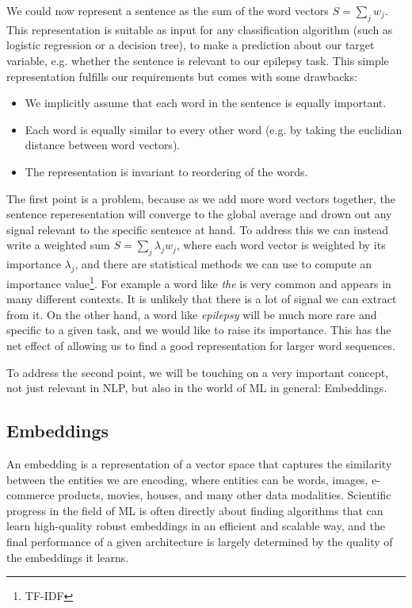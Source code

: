 We could now represent a sentence as the sum of the word vectors $S = \sum_j w_j$. This representation is suitable as input for any classification algorithm (such as logistic regression or a decision tree), to make a prediction about our target variable, e.g. whether the sentence is relevant to our epilepsy task.
This simple representation fulfills our requirements but comes with some drawbacks:
\begin{itemize}
    \item We implicitly assume that each word in the sentence is equally important.
    \item Each word is equally similar to every other word (e.g. by taking the euclidian distance between word vectors).
    \item The representation is invariant to reordering of the words.
\end{itemize}
The first point is a problem, because as we add more word vectors together, the sentence reperesentation will converge to the global average and drown out any signal relevant to the specific sentence at hand.
To address this we can instead write a weighted sum $S = \sum_j \lambda_j w_j$, where each word vector is weighted by its importance $\lambda_j$, and there are statistical methods we can use to compute an importance value\footnote{TF-IDF}.
For example a word like \textit{the} is very common and appears in many different contexts.
It is unlikely that there is a lot of signal we can extract from it.
On the other hand, a word like \textit{epilepsy} will be much more rare and specific to a given task, and we would like to raise its importance.
This has the net effect of allowing us to find a good representation for larger word sequences.

To address the second point, we will be touching on a very important concept, not just relevant in NLP, but also in the world of ML in general: Embeddings.

\subsection{Embeddings}
An embedding is a representation of a vector space that captures the similarity between the entities we are encoding, where entities can be words, images, e-commerce products, movies, houses, and many other data modalities.
Scientific progress in the field of ML is often directly about finding algorithms that can learn high-quality robust embeddings in an efficient and scalable way, and the final performance of a given architecture is largely determined by the quality of the embeddings it learns.

